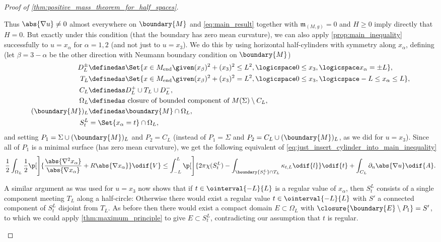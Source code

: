 \documentclass[titlepage,numbers=noenddot,oneside,%
cleardoublepage=empty,paper=a4,fontsize=11pt,%
english,%
]{scrartcl}
\newcommand{\Mend}{M_{\mathrm{end}}} %
\newcommand{\mass}[2]{\mathfrak{m}_{(#1,#2)}} %
\begin{document}
\begin{proof}[Proof of \cref{thm:positive_mass_theorem_for_half_spaces}]
\begin{proofdescription}
        Thus \( \abs{\nabla u}\neq 0 \) almost everywhere on \( \boundary{M} \) and \cref{eq:main_result} together with \( \mass{M}{g}=0 \) and \( H\geq 0 \) imply directly that \( H=0 \). But exactly under this condition (that the boundary has zero mean curvature), we can also apply \cref{prop:main_inequality} successfully to \( u=x_{\alpha} \) for \( \alpha=1,2 \) (and not just to \( u=x_3 \)). We do this by using horizontal half-cylinders with symmetry along \( x_\alpha \), defining (let \( \beta=3-\alpha \) be the other direction with Neumann boundary condition on \( \boundary{M} \))
        \begin{align*}
            D_L^{\pm}&\definedas\Set{x\in \Mend\given (x_\beta)^2+(x_3)^2\leq L^2,\logicspace 0\leq x_3,\logicspace x_\alpha=\pm L},\\
            T_L&\definedas\Set{x\in \Mend\given (x_\beta)^2+(x_3)^2=L^2,\logicspace  0\leq x_3,\logicspace -L\leq x_\alpha\leq L},\\
            C_L&\definedas D_L^+\cup T_L \cup D_L^-,\\
            \Omega_L&\definedas \text{ closure of bounded component of } M(\Sigma)\setminus C_L,\\
            (\boundary{M})_L&\definedas \boundary{M}\cap \Omega_L,\\
            S_t^L&=\Set{x_\alpha=t}\cap \Omega_L,
        \end{align*} 
        and setting \( P_1=\Sigma\cup (\boundary{M})_L \) and \( P_2=C_L \) (instead of \( P_1=\Sigma \) and \( P_2=C_L\cup (\boundary{M})_L \), as we did for \( u=x_3 \)). Since all of \( P_1 \) is a minimal surface (has zero mean curvature), we get the following equivalent of \cref{eq:just_insert_cylinder_into_main_inequality}
        \begin{equation*}
            \frac{1}{2}\int_{\Omega_L}\frac{1}{2}\p[\Bigg]{\frac{\abs{\nabla^2 x_\alpha}}{\abs{\nabla x_\alpha}}+R\abs{\nabla x_{\alpha}}}\odif{V}\leq \int_{-L}^L\p[\Bigg]{2\pi \chi(S_t^L)-\int_{\boundary{S_t^L}\cap  T_L}\kappa_{t,L}\odif{l}}\odif{t}+\int_{C_L} \partial_n \abs{\nabla u}\odif{A}.
        \end{equation*}

        A similar argument as was used for \( u=x_3 \) now shows that if \( t\in \ointerval{-L}{L} \) is a regular value of \( x_\alpha \), then \( S_t^L \) consists of a single component meeting \( T_L \) along a half-circle: Otherwise there would exist a regular value \( t \in \ointerval{-L}{L}\) with \( S' \) a connected component of \( S_t^L \) disjoint from \( T_L \). As before then there would exist a compact domain \( E\subset \Omega_L \) with \( \closure{\boundary{E}\setminus P_1}=S' \), to which we could apply \cref{thm:maximum_principle} to give \( E\subset S_t^L \), contradicting our assumption that \( t \) is regular.


\end{proofdescription}
\end{proof}
\end{document}
